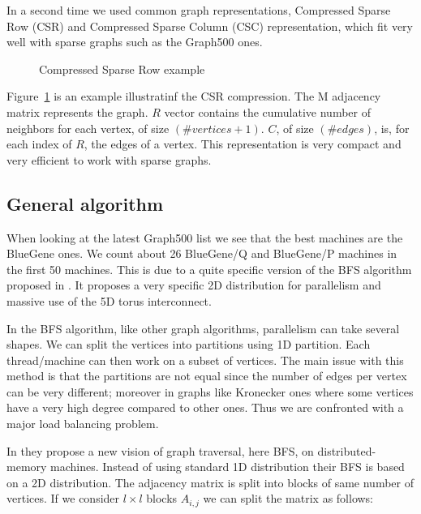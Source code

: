 In a second time we used common graph representations, Compressed Sparse Row (CSR) and Compressed Sparse Column (CSC) representation, which fit very well with sparse graphs such as the Graph500 ones.

\begin{figure}[t!]
\begin{center}

\end{center}
\caption{Compressed Sparse Row example}
\label{fig:csr_representation}
\end{figure}

Figure~\ref{fig:csr_representation} is an example illustratinf the CSR compression.
The M adjacency matrix represents the graph. $R$ vector contains the cumulative number of neighbors for each vertex, of size $(\#vertices +1)$. $C$, of size $(\#edges)$, is, for each index of $R$, the edges of a vertex.
This representation is very compact and very efficient to work with sparse graphs. 

\subsection{General algorithm}

When looking at the latest Graph500 list we see that the best machines are the BlueGene ones. 
We count about 26 BlueGene/Q and BlueGene/P machines in the first 50  machines.
This is due to a quite specific version of the BFS algorithm proposed in \cite{6468459}. 
It proposes a very specific 2D distribution for parallelism and massive use of the 5D torus interconnect. 

In the BFS algorithm, like other graph algorithms, parallelism can take several shapes. 
We can split the vertices into partitions using 1D partition. 
Each thread/machine can then work on a subset of vertices. 
The main issue with this method is that the partitions are not equal since the number of edges per vertex can be very different; 
moreover in graphs like Kronecker ones where some vertices have a very high degree compared to other ones.
Thus we are confronted with a major load balancing problem. 

In \cite{6468459} they propose a new vision of graph traversal, here BFS, on distributed-memory machines. 
Instead of using standard 1D distribution their BFS is based on a 2D distribution. 
The adjacency matrix is split into blocks of same number of vertices.
If we consider $l\times l$ blocks $A_{i,j}$ we can split the matrix as follows:

